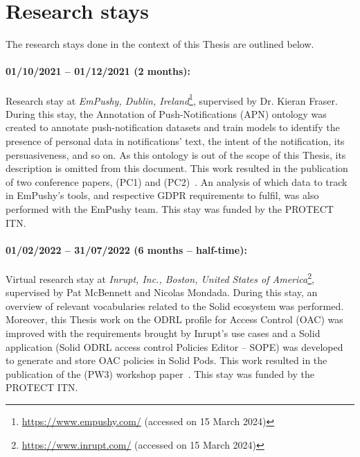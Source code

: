 \section{Research stays}
\label{sec:research_stays}

The research stays done in the context of this Thesis are outlined below.

\paragraph{01/10/2021 -- 01/12/2021 (2 months):} Research stay at \textit{EmPushy, Dublin, Ireland}\footnote{\url{https://www.empushy.com/} (accessed on 15 March 2024)}, supervised by Dr. Kieran Fraser. During this stay, the Annotation of Push-Notifications (APN) ontology was created to annotate push-notification datasets and train models to identify the presence of personal data in notifications' text, the intent of the notification, its persuasiveness, and so on. As this ontology is out of the scope of this Thesis, its description is omitted from this document. This work resulted in the publication of two conference papers, (PC1) and (PC2)~\citep{esteves_extracting_2022, esteves_now_2022}. An analysis of which data to track in EmPushy's tools, and respective GDPR requirements to fulfil, was also performed with the EmPushy team. This stay was funded by the PROTECT ITN.

\paragraph{01/02/2022 -- 31/07/2022 (6 months -- half-time):} Virtual research stay at \textit{Inrupt, Inc., Boston, United States of America}\footnote{\url{https://www.inrupt.com/} (accessed on 15 March 2024)}, supervised by Pat McBennett and Nicolas Mondada. During this stay, an overview of relevant vocabularies related to the Solid ecosystem was performed. Moreover, this Thesis work on the ODRL profile for Access Control (OAC) was improved with the requirements brought by Inrupt's use cases and a Solid application (Solid ODRL access control Policies Editor -- SOPE) was developed to generate and store OAC policies in Solid Pods. This work resulted in the publication of the (PW3) workshop paper~\citep{esteves_using_2022}. This stay was funded by the PROTECT ITN.

